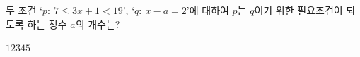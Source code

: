 두 조건 `$p:\ 7\le 3x+1<19$', `$q:\ x-a=2$'에 대하여 $p$는 $q$이기 위한 필요조건이 되도록 하는 정수 $a$의 개수는?
\begin{choices32}{$1$}{$2$}{$3$}{$4$}{$5$}\end{choices32}
